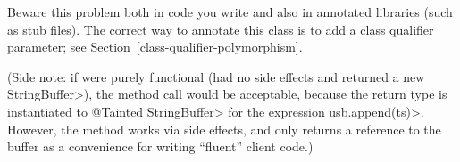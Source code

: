 Beware this problem both in code you write and also in annotated libraries
(such as stub files).  The correct way to annotate this class is to
add a class qualifier parameter; see Section~\ref{class-qualifier-polymorphism}.

(Side note:  if  were purely functional (had no side effects
and returned a new \<StringBuffer>), the method call would be acceptable,
because the return type is instantiated to \<@Tainted StringBuffer> for the
expression \<usb.append(ts)>.  However, the  method works via
side effects, and only returns a reference to the buffer as a convenience
for writing ``fluent'' client code.)


